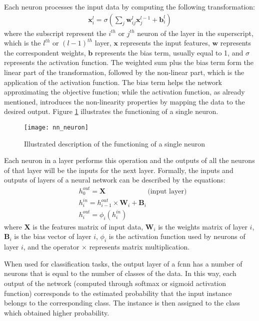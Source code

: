 Each neuron processes the input data by computing the following transformation:
\begin{align}
    \mathbf{x}_{i}^{l}=\sigma\left(\sum_{j} \mathbf{w}_{ij}^{l} \mathbf{x}_{j}^{l-1} + \mathbf{b}_{i}^{l}\right)
\end{align}
where the subscript represent the $i^{th}$ or $j^{th}$ neuron of the layer in the superscript, which is the $l^{th}$ or $(l-1)^{th}$ layer, $\mathbf{x}$ represents the input features, $\mathbf{w}$ represents the correspondent weights, $\mathbf{b}$ represents the bias term, usually equal to 1, and $\sigma$ represents the activation function. The weighted sum plus the bias term form the linear part of the transformation, followed by the non-linear part, which is the application of the activation function. The bias term helps the network approximating the objective function; while the activation function, as already mentioned, introduces the non-linearity properties by mapping the data to the desired output. Figure \ref{fig:nn_neuron} illustrates the functioning of a single neuron.
\begin{figure}[htbp]
    \centering
    \texttt{[image: nn\_neuron]}
    \caption{Illustrated description of the functioning of a single neuron}
    \label{fig:nn_neuron}
\end{figure}

Each neuron in a layer performs this operation and the outputs of all the neurons of that layer will be the inputs for the next layer. Formally, the inputs and outputs of layers of a neural network can be described by the equations:
\begin{align}
    &h^{\textit{out}}_{0} = \mathbf{X}\qquad\qquad\qquad \text{(input layer)}\\
    &h^{\textit{in}}_{i} = h^{\textit{out}}_{i-1} \times \mathbf{W}_i + \mathbf{B}_i\\
    &h^{\textit{out}}_{i} = \phi_i (h^{\textit{in}}_{i})
\end{align}
where $\mathbf{X}$ is the features matrix of input data, $\mathbf{W}_i$ is the weights matrix of layer $i$, $\mathbf{B}_i$ is the bias vector of layer $i$, $\phi_i$ is the activation function used by neurons of layer $i$, and the operator $\times$ represents matrix multiplication.

When used for classification tasks, the output layer of a \acs{fcnn} has a number of neurons that is equal to the number of classes of the data. In this way, each output of the network (computed through softmax or sigmoid activation function) corresponds to the estimated probability that the input instance belongs to the corresponding class. The instance is then assigned to the class which obtained higher probability.

